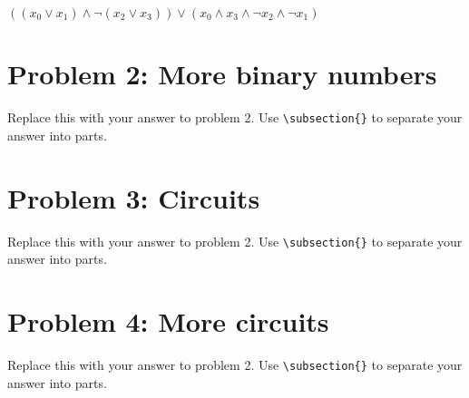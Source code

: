 \documentclass[titlepage]{article}
\begin{document}
\(((x_0\lor x_1)\land \lnot(x_2\lor x_3)) \lor (x_0 \land x_3 \land \lnot x_2 \land \lnot x_1)\)


\section{Problem 2: More binary numbers}

Replace this with your answer to problem 2.  Use \verb|\subsection{}| to separate your answer into parts.

\section{Problem 3: Circuits}

Replace this with your answer to problem 2.  Use \verb|\subsection{}| to separate your answer into parts.

\section{Problem 4: More circuits}

Replace this with your answer to problem 2.  Use \verb|\subsection{}| to separate your answer into parts.
\end{document}
